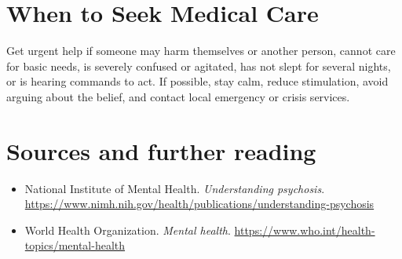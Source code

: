 \section*{When to Seek Medical Care}
Get urgent help if someone may harm themselves or another person, cannot care for basic needs, is severely confused or agitated, has not slept for several nights, or is hearing commands to act. If possible, stay calm, reduce stimulation, avoid arguing about the belief, and contact local emergency or crisis services.

\section*{Sources and further reading}
\begin{itemize}
\item National Institute of Mental Health. \textit{Understanding psychosis}. \url{https://www.nimh.nih.gov/health/publications/understanding-psychosis}
\item World Health Organization. \textit{Mental health}. \url{https://www.who.int/health-topics/mental-health}
\end{itemize}
